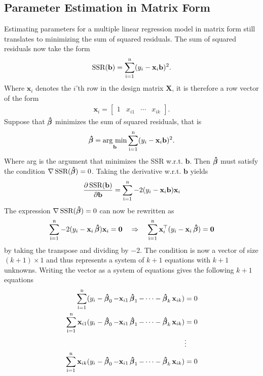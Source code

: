 \subsection{Parameter Estimation in Matrix Form}
Estimating parameters for a multiple linear regression model in matrix form still translates to minimizing the sum of squared residuals.
The sum of squared residuals now take the form
\begin{align*}
    \operatorname{\text{SSR}}(\mathbf{b}) = \operatorname{\sum_{i=1}^n} (y_i - \mathbf{x}_i\mathbf{b})^2.
\end{align*}
Where $\mathbf{x}_i$ denotes the $i$'th row in the design matrix $\mathbf{X}$, it is therefore a row vector of the form
\begin{align*}
    \mathbf{x}_i = \begin{bmatrix} 1 & x_{i1} & \cdots & x_{ik} \end{bmatrix}.
\end{align*}
Suppose that $\operatorname{\boldsymbol{\hat{\beta}}}$ minimizes the sum of squared residuals, that is
\begin{align*}
    \operatorname{\boldsymbol{\hat{\beta}}} = \underset{\mathbf{b}}{\operatorname{\text{arg min}}} \operatorname{\sum_{i=1}^n} (y_i - \mathbf{x}_i\mathbf{b})^2.
\end{align*}
Where arg is the argument that minimizes the SSR w.r.t.$\!$ $\textbf{b}$. Then $\operatorname{\boldsymbol{\hat{\beta}}}$ must satisfy the condition $\nabla \operatorname{\text{SSR}}(\operatorname{\boldsymbol{\hat{\beta}}}) = 0$.
Taking the derivative w.r.t. $\mathbf{b}$ yields
\begin{align}\label{eq:ssr_derivative}
    \frac{\partial \operatorname{\text{SSR}}(\mathbf{b})}{\partial \mathbf{b}} 
    =  \operatorname{\sum_{i=1}^n} -2(y_i - \mathbf{x}_i \mathbf{b})\mathbf{x}_i
\end{align}
The expression $\nabla \operatorname{\text{SSR}} (\operatorname{\boldsymbol{\hat{\beta}}}) = 0$ can now be rewritten as
\begin{align*}
    \operatorname{\sum_{i=1}^n} -2(y_i - \mathbf{x}_i \operatorname{\boldsymbol{\hat{\beta}}})\mathbf{x}_i = \mathbf{0} 
    \quad \Rightarrow \quad
    \operatorname{\sum_{i=1}^n} \mathbf{x}_i^\top(y_i - \mathbf{x}_i \operatorname{\boldsymbol{\hat{\beta}}}) = \mathbf{0}
\end{align*}
by taking the transpose and dividing by $-2$.
The condition is now a vector of size $(k + 1) \times 1$ and thus represents a system of $k + 1$ equations with $k + 1$ unknowns.
Writing the vector as a system of equations gives the following $k + 1$ equations
\begin{align}\label{eq:multiple_linear_regression_equations}
\begin{split}
    \operatorname{\sum_{i=1}^n} (y_i - \operatorname{\boldsymbol{\hat{\beta}}}_0 -  \mathbf{x}_{i1} \operatorname{\boldsymbol{\hat{\beta}}}_1 - \cdots - \operatorname{\boldsymbol{\hat{\beta}}}_k \mathbf{x}_{ik}) &= 0 \\
    \operatorname{\sum_{i=1}^n} \mathbf{x}_{i1}(y_i - \operatorname{\boldsymbol{\hat{\beta}}}_0 -  \mathbf{x}_{i1} \operatorname{\boldsymbol{\hat{\beta}}}_1 - \cdots - \operatorname{\boldsymbol{\hat{\beta}}}_k \mathbf{x}_{ik}) &= 0 \\
    &\vdots \\
    \operatorname{\sum_{i=1}^n} \mathbf{x}_{ik}(y_i - \operatorname{\boldsymbol{\hat{\beta}}}_0 -  \mathbf{x}_{i1} \operatorname{\boldsymbol{\hat{\beta}}}_1 - \cdots - \operatorname{\boldsymbol{\hat{\beta}}}_k \mathbf{x}_{ik}) &= 0
\end{split}
\end{align}
